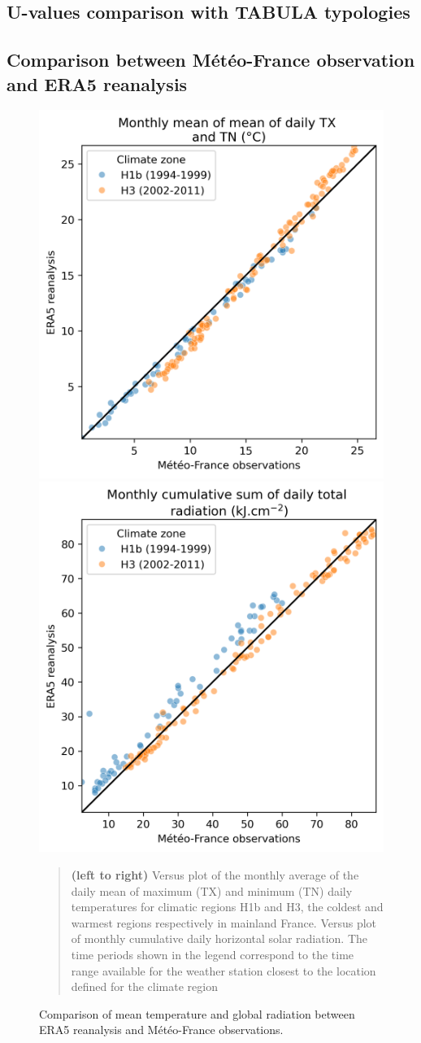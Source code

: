 \documentclass[11pt]{article}
\begin{document}
    \subsection{U-values comparison with TABULA typologies} %
    \label{sub:u_values_comparison_with_tabula_typologies}
    

    \subsection{Comparison between Météo-France observation and ERA5 reanalysis} %
    \label{sub:comparison_between_mf_observation_and_era5_reanalysis_data}
    
    \begin{figure}[ht]
        \centering
        \includegraphics[width=0.49\columnwidth]{figures/comparison_TM_MF_ERA5.png}
        \includegraphics[width=0.49\columnwidth]{figures/comparison_GLOT_MF_ERA5.png}
        \caption{\label{fig:comparison_mf} Comparison of mean temperature and global radiation between ERA5 reanalysis and Météo-France observations.}
        \begin{quote}
            \vspace{-2mm}
            \small\noindent
            \textbf{(left to right)} Versus plot of the monthly average of the daily mean of maximum (TX) and minimum (TN) daily temperatures for climatic regions H1b and H3, the coldest and warmest regions respectively in mainland France. Versus plot of monthly cumulative daily horizontal solar radiation. The time periods shown in the legend correspond to the time range available for the weather station closest to the location defined for the climate region 
          \end{quote}
    \end{figure}
\end{document}

